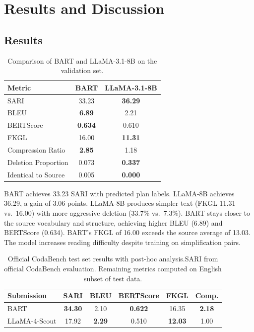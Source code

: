\documentclass{ceurart}
\begin{document}
\section{Results and Discussion}

\subsection{Results}

\begin{table}[t]
\centering
\caption{Comparison of BART and LLaMA-3.1-8B on the validation set.}
\label{tab:val-results}
\begin{tabular}{lcc}
\toprule
Metric & BART & LLaMA-3.1-8B \\
\midrule
SARI               & 33.23 & \textbf{36.29} \\
BLEU               & \textbf{6.89} & 2.21 \\
BERTScore          & \textbf{0.634} & 0.610 \\
FKGL               & 16.00 & \textbf{11.31} \\
Compression Ratio  & \textbf{2.85} & 1.18 \\
Deletion Proportion& 0.073 & \textbf{0.337} \\
Identical to Source& 0.005 & \textbf{0.000} \\
\bottomrule
\end{tabular}
\end{table}

BART achieves 33.23 SARI with predicted plan labels. LLaMA-8B achieves 36.29, a gain of 3.06 points.
LLaMA-8B produces simpler text (FKGL 11.31 vs.\ 16.00) with more aggressive deletion (33.7\% vs.\ 7.3\%). BART stays closer to the source vocabulary and structure, achieving higher BLEU (6.89) and BERTScore (0.634). BART's FKGL of 16.00 exceeds the source average of 13.03. The model increases reading difficulty despite training on simplification pairs.

\begin{table}[t]
\centering
\caption{Official CodaBench test set results with post-hoc analysis.\newline\small{SARI from official CodaBench evaluation. Remaining metrics computed on English subset of test data.}}
\label{tab:test-results}
\begin{tabular}{lccccc}
\toprule
Submission & SARI & BLEU & BERTScore & FKGL & Comp. \\
\midrule
BART & \textbf{34.30} & 2.10 & \textbf{0.622} & 16.35 & \textbf{2.18} \\
LLaMA-4-Scout & 17.92 & \textbf{2.29} & 0.510 & \textbf{12.03} & 1.00 \\
\bottomrule
\end{tabular}
\end{table}
\end{document}
